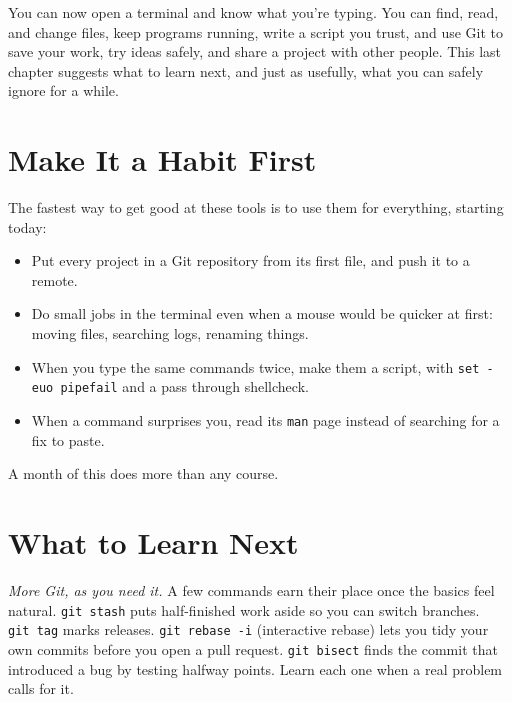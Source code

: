 
\begin{chapterintro}

You can now open a terminal and know what you're typing. You can find, read, and change files, keep programs running, write a script you trust, and use Git to save your work, try ideas safely, and share a project with other people. This last chapter suggests what to learn next, and just as usefully, what you can safely ignore for a while.

\end{chapterintro}

\section{Make It a Habit First}\label{13-where-to-go-from-here:make-it-a-habit-first}

The fastest way to get good at these tools is to use them for everything, starting today:

\begin{itemize}
\tightlist
\item
  Put every project in a Git repository from its first file, and push it to a remote.
\item
  Do small jobs in the terminal even when a mouse would be quicker at first: moving files, searching logs, renaming things.
\item
  When you type the same commands twice, make them a script, with \texttt{set\ -euo\ pipefail} and a pass through shellcheck.
\item
  When a command surprises you, read its \texttt{man} page instead of searching for a fix to paste.
\end{itemize}

A month of this does more than any course.

\section{What to Learn Next}\label{13-where-to-go-from-here:what-to-learn-next}

\emph{More Git, as you need it.} A few commands earn their place once the basics feel natural. \texttt{git\ stash} puts half-finished work aside so you can switch branches. \texttt{git\ tag} marks releases. \texttt{git\ rebase\ -i} (interactive rebase) lets you tidy your own commits before you open a pull request. \texttt{git\ bisect} finds the commit that introduced a bug by testing halfway points. Learn each one when a real problem calls for it.


